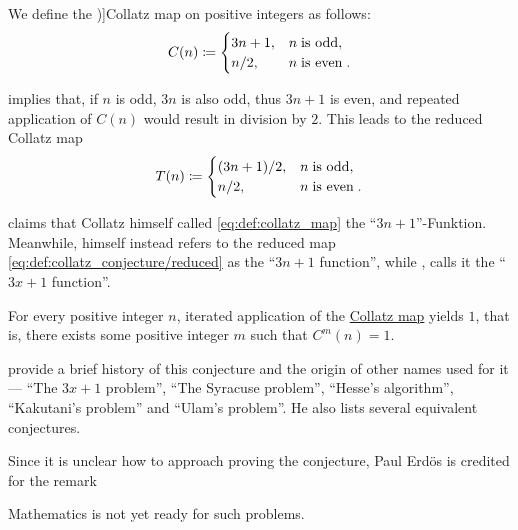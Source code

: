 \begin{definition}\label{def:collatz_map}
  We define the \term[en=Collatz function (\cite[1]{Lagarias2021CollatzOverview})]{Collatz map} on positive integers as follows:
  \begin{equation}\label{eq:def:collatz_map}
    C(n) \coloneqq \begin{cases}
      3n + 1, &n \T{is odd}, \\
      n / 2,  &n \T{is even}.
    \end{cases}
  \end{equation}
\end{definition}
\begin{comments}
  \item {} implies that, if \( n \) is odd, \( 3n \) is also odd, thus \( 3n + 1 \) is even, and repeated application of \( C(n) \) would result in division by \( 2 \). This leads to the reduced Collatz map
  \begin{equation}\label{eq:def:collatz_conjecture/reduced}
    T(n) \coloneqq \begin{cases}
      (3n + 1) / 2, &n \T{is odd}, \\
      n / 2,        &n \T{is even}.
    \end{cases}
  \end{equation}

  \item {} claims that Collatz himself called \eqref{eq:def:collatz_map} the \enquote{\( 3n + 1 \)}-Funktion. Meanwhile,  himself instead refers to the reduced map \eqref{eq:def:collatz_conjecture/reduced} as the \enquote{\( 3n + 1 \) function}, while , calls it the \enquote{\( 3x + 1 \) function}.
\end{comments}

\begin{conjecture}\label{hyp:collatz_conjecture}
  For every positive integer \( n \), iterated application of the \hyperref[def:collatz_map]{Collatz map} yields \( 1 \), that is, there exists some positive integer \( m \) such that \( C^m(n) = 1 \).
\end{conjecture}
\begin{comments}
  \item {} provide a brief history of this conjecture and the origin of other names used for it --- \enquote{The \( 3x + 1 \) problem}, \enquote{The Syracuse problem}, \enquote{Hesse's algorithm}, \enquote{Kakutani's problem} and \enquote{Ulam's problem}. He also lists several equivalent conjectures.

  Since it is unclear how to approach proving the conjecture, Paul Erd\"os is credited for the remark
  \begin{displayquote}
    Mathematics is not yet ready for such problems.
  \end{displayquote}
\end{comments}


